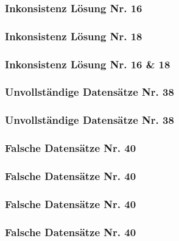 \begin{frame}
  \frametitle{Inkonsistenz \hfill Lösung Nr. 16}
\end{frame}

\begin{frame}
  \frametitle{Inkonsistenz \hfill Lösung Nr. 18}
\end{frame}

\begin{frame}
  \frametitle{Inkonsistenz \hfill Lösung Nr. 16 \& 18}
\end{frame}


\begin{frame}
  \frametitle{Unvollständige Datensätze \hfill Nr. 38}
\end{frame}

\begin{frame}
  \frametitle{Unvollständige Datensätze \hfill Nr. 38}
\end{frame}


\begin{frame}
  \frametitle{Falsche Datensätze \hfill Nr. 40}
\end{frame}

\begin{frame}
  \frametitle{Falsche Datensätze \hfill Nr. 40}
\end{frame}

\begin{frame}
  \frametitle{Falsche Datensätze \hfill Nr. 40}
\end{frame}

\begin{frame}
  \frametitle{Falsche Datensätze \hfill Nr. 40}
\end{frame}



